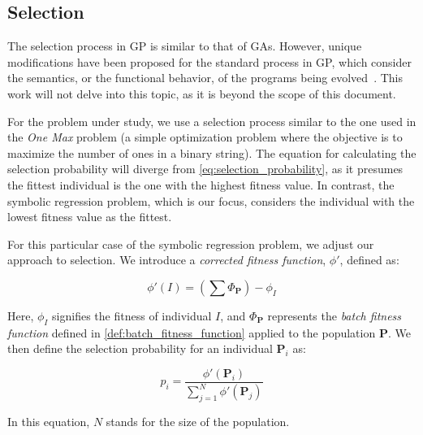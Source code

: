 
\subsection{Selection}
\label{sec:background:genetic_programming:selection}
  The selection process in GP is similar to that of GAs.
  However, unique modifications have been proposed for the standard process in 
  GP, which consider the semantics, or the functional behavior, of the programs 
  being evolved~\autocite{liskowskiComparisonSemanticawareSelection2015}.
  This work will not delve into this topic, as it is beyond the scope of this
  document.

  For the problem under study, we use a selection process similar to the one 
  used in the \textit{One Max} problem (a simple optimization problem where the 
  objective is to maximize the number of ones in a binary string).
  The equation for calculating the selection probability will diverge from 
  \vref{eq:selection_probability}, as it presumes the fittest individual is the 
  one with the highest fitness value.
  In contrast, the symbolic regression problem, which is our focus, considers the
  individual with the lowest fitness value as the fittest.

  For this particular case of the symbolic regression problem, we adjust our 
  approach to selection.
  We introduce a \emph{corrected fitness function}, \(\phi'\), defined as:

  \begin{equation}
    \label{eq:bg:gp:sym:corrected_fitness}
    \phi'(I) = \left(\sum \Phi_\mathbf{P}\right) - \phi_I
  \end{equation}

  Here, \(\phi_I\) signifies the fitness of individual \(I\), and 
  \(\Phi_\mathbf{P}\) represents the \textit{batch fitness function} defined in 
  \vref{def:batch_fitness_function} applied to the population \(\mathbf{P}\).
  We then define the selection probability for an individual \(\mathbf{P}_i\) as:

  \begin{equation}
    \label{eq:bg:gp:sym:selection_probability}
    p_i = \frac{\phi'(\mathbf{P}_i)}{\sum_{j = 1}^N \phi'(\mathbf{P}_j)}
  \end{equation}

  In this equation, \(N\) stands for the size of the population.

